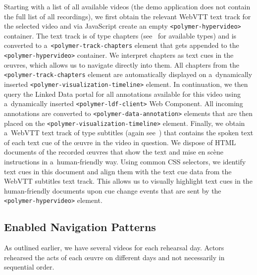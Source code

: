 \documentclass[runningheads,a4paper]{llncs}
\begin{document}
Starting with a list of all available videos
(the demo application does not contain the full list of all recordings),
we first obtain the relevant WebVTT text track for the selected video
and via JavaScript create an empty \texttt{<polymer-hypervideo>} container.
The text track is of type chapters (see~\cite{pfeiffer2013webvtt} for available types)
and is converted to a~\texttt{<polymer-track-chapters} element
that gets appended to the \texttt{<polymer-hypervideo>} container.
We interpret chapters as text cues in the œuvres, which allows us to navigate directly into them.
All chapters from the \texttt{<polymer-track-chapters} element are automatically displayed
on a~dynamically inserted \texttt{<polymer-visualization-timeline>} element.
In continuation, we then query the Linked Data portal for all annotations available for this video
using a~dynamically inserted \texttt{<polymer-ldf-client>} Web Component.
All incoming annotations are converted to \texttt{<polymer-data-annotation>} elements
that are then placed on the \texttt{<polymer-visualization-timeline>} element.
Finally, we obtain a~WebVTT text track of type subtitles (again see~\cite{pfeiffer2013webvtt})
that contains the spoken text of each text cue of the œuvre in the video in question.
We dispose of HTML documents of the recorded œuvres
that show the text and mise en scène instructions in a~human-friendly way.
Using common CSS selectors, we identify text cues in this document and align them
with the text cue data from the WebVTT subtitles text track.
This allows us to visually highlight text cues in the human-friendly documents
upon cue change events that are sent by the \texttt{<polymer-hypervideo>} element.

\subsection{Enabled Navigation Patterns}

As outlined earlier, we have several videos for each rehearsal day.
Actors rehearsed the acts of each œuvre on different days
and not necessarily in sequential order.
\end{document}
